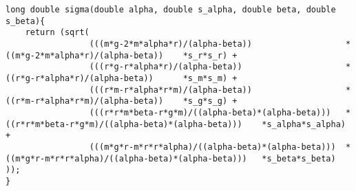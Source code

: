 \begin{verbatim}
long double sigma(double alpha, double s_alpha, double beta, double s_beta){
    return (sqrt(
				 (((m*g-2*m*alpha*r)/(alpha-beta))   				 *   ((m*g-2*m*alpha*r)/(alpha-beta))    *s_r*s_r) +
                 (((r*g-r*alpha*r)/(alpha-beta))     				 *   ((r*g-r*alpha*r)/(alpha-beta))      *s_m*s_m) +
                 (((r*m-r*alpha*r*m)/(alpha-beta))   				 *   ((r*m-r*alpha*r*m)/(alpha-beta))    *s_g*s_g) +
                 (((r*r*m*beta-r*g*m)/((alpha-beta)*(alpha-beta)))   *   ((r*r*m*beta-r*g*m)/((alpha-beta)*(alpha-beta)))    *s_alpha*s_alpha) +
                 (((m*g*r-m*r*r*alpha)/((alpha-beta)*(alpha-beta)))  *   ((m*g*r-m*r*r*alpha)/((alpha-beta)*(alpha-beta)))   *s_beta*s_beta) ));
}

\end{verbatim}
